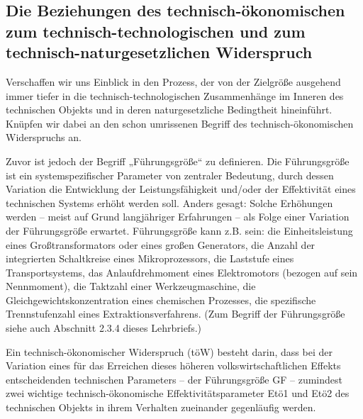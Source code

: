 \documentclass[12pt,a4paper]{article}
\begin{document}
\subsection{Die Beziehungen des technisch-ökonomischen zum
  technisch-technologischen und zum technisch-naturgesetzlichen Widerspruch}

Verschaffen wir uns Einblick in den Prozess, der von der Zielgröße ausgehend
immer tiefer in die technisch-technologischen Zusammenhänge im Inneren des
technischen Objekts und in deren naturgesetzliche Bedingtheit hineinführt.
Knüpfen wir dabei an den schon umrissenen Begriff des technisch-ökonomischen
Widerspruchs an.

Zuvor ist jedoch der Begriff „Führungsgröße“ zu definieren. Die Führungsgröße
ist ein systemspezifischer Parameter von zentraler Bedeutung, durch dessen
Variation die Entwicklung der Leistungsfähigkeit und/oder der Effektivität
eines technischen Systems erhöht werden soll. Anders gesagt: Solche Erhöhungen
werden – meist auf Grund langjähriger Erfahrungen -- als Folge einer Variation
der Führungsgröße erwartet. Führungsgröße kann z.B. sein: die Einheitsleistung
eines Großtransformators oder eines großen Generators, die Anzahl der
integrierten Schaltkreise eines Mikroprozessors, die Laststufe eines
Transportsystems, das Anlaufdrehmoment eines Elektromotors (bezogen auf sein
Nennmoment), die Taktzahl einer Werkzeugmaschine, die
Gleichgewichtskonzentration eines chemischen Prozesses, die spezifische
Trennstufenzahl eines Extraktionsverfahrens. (Zum Begriff der Führungsgröße
siehe auch Abschnitt 2.3.4 dieses Lehrbriefs.)

Ein technisch-ökonomischer Widerspruch (töW) besteht darin, dass bei der
Variation eines für das Erreichen dieses höheren volkswirtschaftlichen Effekts
entscheidenden technischen Parameters – der Führungsgröße GF – zumindest zwei
wichtige technisch-ökonomische Effektivitätsparameter Etö1 und Etö2 des
technischen Objekts in ihrem Verhalten zueinander gegenläufig werden.
\end{document}
